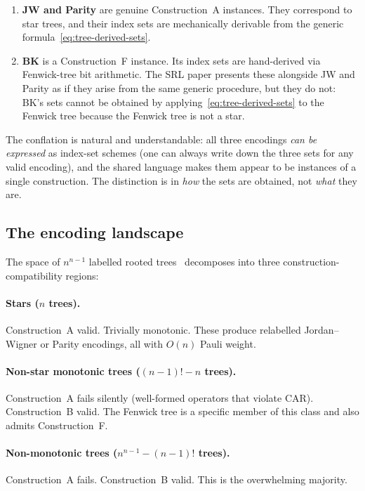 \begin{enumerate}
  \item \textbf{JW and Parity} are genuine Construction~A instances.
    They correspond to star trees, and their index sets are
    mechanically derivable from the generic
    formula~\eqref{eq:tree-derived-sets}.

  \item \textbf{BK} is a Construction~F instance.  Its index sets are
    hand-derived via Fenwick-tree bit arithmetic.  The SRL paper
    presents these alongside JW and Parity as if they arise from the
    same generic procedure, but they do not: BK's sets cannot be
    obtained by applying~\eqref{eq:tree-derived-sets} to the Fenwick
    tree because the Fenwick tree is not a star.
\end{enumerate}

The conflation is natural and understandable: all three encodings
\emph{can be expressed} as index-set schemes (one can always write
down the three sets for any valid encoding), and the shared language
makes them appear to be instances of a single construction.  The
distinction is in \emph{how} the sets are obtained, not \emph{what}
they are.

\subsection{The encoding landscape}
\label{sec:tree-census}

The space of $n^{n-1}$ labelled rooted trees~\cite{cayley1889}
decomposes into three construction-compatibility regions:

\paragraph{Stars ($n$ trees).}
Construction~A valid.  Trivially monotonic.  These produce relabelled
Jordan--Wigner or Parity encodings, all with $O(n)$ Pauli weight.

\paragraph{Non-star monotonic trees ($(n{-}1)! - n$ trees).}
Construction~A fails silently (well-formed operators that violate
CAR).  Construction~B valid.  The Fenwick tree is a specific member
of this class and also admits Construction~F.

\paragraph{Non-monotonic trees ($n^{n-1} - (n{-}1)!$ trees).}
Construction~A fails.  Construction~B valid.  This is the
overwhelming majority.

